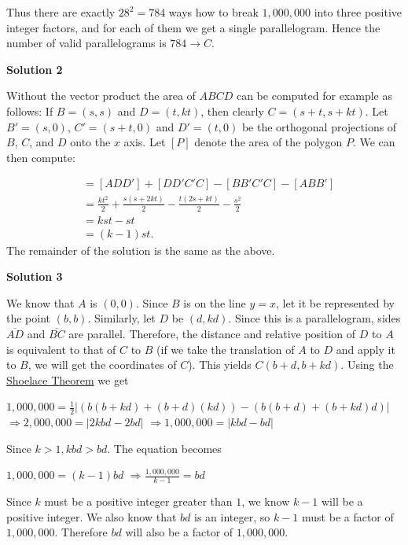 \begin{enumerate}
 Thus there are exactly $28^2 = 784$ ways how to break $1,\!000,\!000$ into three positive integer factors, and for each of them we get a single parallelogram. Hence the number of valid parallelograms is $784 \longrightarrow \boxed{C}$.

 



\textbf{Solution 2}

Without the vector product the area of $ABCD$ can be computed for example as follows: If $B=(s,s)$ and $D=(t,kt)$, then clearly $C=(s+t,s+kt)$. Let $B'=(s,0)$, $C'=(s+t,0)$ and $D'=(t,0)$ be the orthogonal projections of $B$, $C$, and $D$ onto the $x$ axis. Let $[P]$ denote the area of the polygon $P$. We can then compute:

 
 \begin{align*} [ABCD] & = [ADD'] + [DD'C'C] - [BB'C'C] - [ABB'] \\ & = \frac{kt^2}2 + \frac{s(s+2kt)}2 - \frac{t(2s+kt)}2 - \frac{s^2}2 \\ & = kst - st \\ & = (k-1)st. \end{align*}
The remainder of the solution is the same as the above.

 


 



\textbf{Solution 3}

We know that $A$ is $(0, 0)$. Since $B$ is on the line $y=x$, let it be represented by the point $(b, b)$. Similarly, let $D$ be $(d, kd)$. Since this is a parallelogram, sides $\overline{AD}$ and $\overline{BC}$ are parallel. Therefore, the distance and relative position of $D$ to $A$ is equivalent to that of $C$ to $B$ (if we take the translation of $A$ to $D$ and apply it to $B$, we will get the coordinates of $C$). This yields $C (b+d, b+kd)$. Using the \href{https://artofproblemsolving.com/wiki/index.php?title=Shoelace\_Theorem}{Shoelace Theorem} we get

 
$1,000,000 = \frac{1}{2}|\left(b(b+kd) + (b+d)(kd)\right) - \left(b(b+d) + (b+kd)d\right)|$
$\Rightarrow 2,000,000 = |2kbd - 2bd|$
$\Rightarrow 1,000,000 = |kbd - bd|$

 
Since $k > 1, kbd > bd$. The equation becomes

 
$1,000,000 = (k-1)bd$
$\Rightarrow \frac{1,000,000}{k-1} = bd$

 
Since $k$ must be a positive integer greater than $1$, we know $k-1$ will be a positive integer. We also know that $bd$ is an integer, so $k-1$ must be a factor of $1,000,000$. Therefore $bd$ will also be a factor of $1,000,000$.


\end{enumerate}

